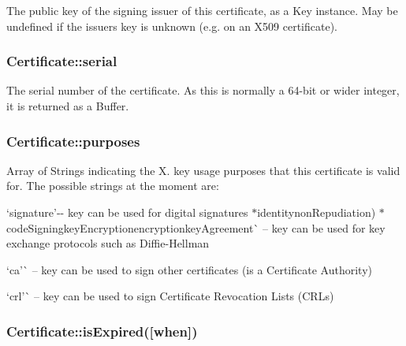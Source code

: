 The public key of the signing issuer of this certificate, as a {\ttfamily Key} instance. May be {\ttfamily undefined} if the issuer\textquotesingle{}s key is unknown (e.\+g. on an X509 certificate).

\subsubsection*{{\ttfamily Certificate\+::serial}}

The serial number of the certificate. As this is normally a 64-\/bit or wider integer, it is returned as a Buffer.

\subsubsection*{{\ttfamily Certificate\+::purposes}}

Array of Strings indicating the X. key usage purposes that this certificate is valid for. The possible strings at the moment are\+:


\begin{DoxyItemize}
\item `\textquotesingle{}signature'{\ttfamily -\/-\/ key can be used for digital signatures $\ast$}\textquotesingle{}identitynon\+Repudiation{\ttfamily ) $\ast$}\textquotesingle{}code\+Signing\textquotesingle{}key\+Encryption\textquotesingle{}encryption\textquotesingle{}key\+Agreement\textquotesingle{}\`{} -- key can be used for key exchange protocols such as Diffie-\/\+Hellman
\item `\textquotesingle{}ca'\`{} -- key can be used to sign other certificates (is a Certificate Authority)
\item `\textquotesingle{}crl'\`{} -- key can be used to sign Certificate Revocation Lists (C\+R\+Ls)
\end{DoxyItemize}

\subsubsection*{{\ttfamily Certificate\+::is\+Expired(\mbox{[}when\mbox{]})}}

